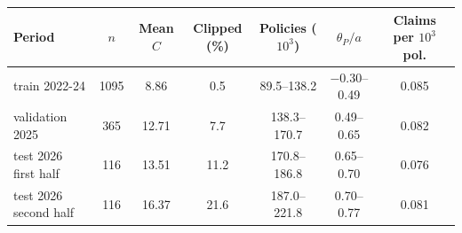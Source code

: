 \begin{tabular}{@{}lcccccc@{}}
\toprule
Period & $n$ & Mean $C$ & Clipped (\%) & Policies ($10^3$) & $\theta_P/a$ & Claims per $10^3$ pol. \\
\midrule
train 2022-24 & 1095 & 8.86 & 0.5 & 89.5--138.2 & $-$0.30--0.49 & 0.085 \\
validation 2025 & 365 & 12.71 & 7.7 & 138.3--170.7 & 0.49--0.65 & 0.082 \\
test 2026 first half & 116 & 13.51 & 11.2 & 170.8--186.8 & 0.65--0.70 & 0.076 \\
test 2026 second half & 116 & 16.37 & 21.6 & 187.0--221.8 & 0.70--0.77 & 0.081 \\
\bottomrule
\end{tabular}
